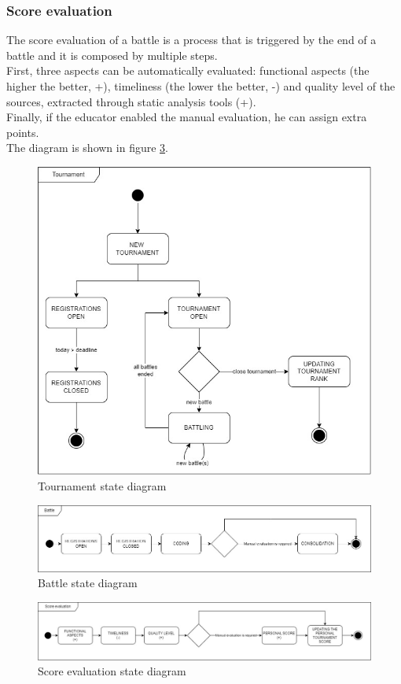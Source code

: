 \subsubsection*{Score evaluation}
The score evaluation of a battle is a process that is triggered by the end of a battle and it is composed by multiple steps.\\
First, three aspects can be automatically evaluated: functional aspects (the higher the better, +), timeliness (the lower the better, -) and quality level of the sources, extracted through static analysis tools (+). \\
Finally, if the educator enabled the manual evaluation, he can assign extra points. \\
The diagram is shown in figure \ref{fig:score-evaluation-state-diagram}.

\begin{figure}[H]
    \centering
    \includegraphics[width=.8\textwidth]{images/state_diagrams/tournament.jpg}
    \caption{Tournament state diagram}
    \label{fig:tournament-state-diagram}
\end{figure}
\begin{figure}[H]
    \centering
    \includegraphics[width=1\textwidth]{images/state_diagrams/battle.jpg}
    \caption{Battle state diagram}
    \label{fig:battle-state-diagram}
\end{figure}
\begin{figure}[H]
    \centering
    \includegraphics[width=1\textwidth]{images/state_diagrams/score_evaluation.jpg}
    \caption{Score evaluation state diagram}
    \label{fig:score-evaluation-state-diagram}
\end{figure}

